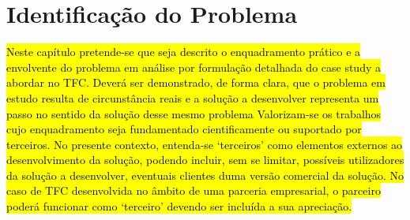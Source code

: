 \chapter{Identificação do Problema}

\hl{Neste capítulo pretende-se que seja descrito o enquadramento prático e a envolvente do problema em análise por formulação detalhada do case study a abordar no TFC. 
Deverá ser demonstrado, de forma clara, que o problema em estudo resulta de circunstância reais e a solução a desenvolver representa um passo no sentido da solução desse mesmo problema 
Valorizam-se os trabalhos cujo enquadramento seja fundamentado cientificamente ou suportado por terceiros. No presente contexto, entenda-se ‘terceiros’ como elementos externos ao desenvolvimento da solução, podendo incluir, sem se limitar, possíveis utilizadores da solução a desenvolver, eventuais clientes duma versão comercial da solução. 
No caso de TFC desenvolvida no âmbito de uma parceria empresarial, o parceiro poderá funcionar como ‘terceiro’ devendo ser incluída a sua apreciação.}